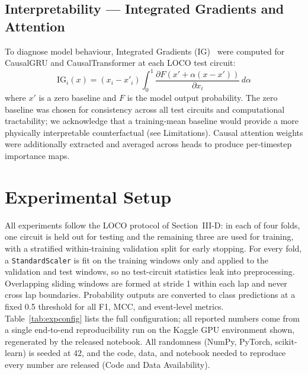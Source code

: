 \documentclass[conference,a4paper]{IEEEtran}
\begin{document}
\subsection{Interpretability — Integrated Gradients and Attention}

To diagnose model behaviour, Integrated Gradients (IG)~\cite{ref_ig} were computed
for CausalGRU and CausalTransformer at each LOCO test circuit:
\begin{equation}
  \text{IG}_i(x) = (x_i - x'_i) \int_0^1
    \frac{\partial F(x' + \alpha(x - x'))}{\partial x_i} \, d\alpha
  \label{eq:ig}
\end{equation}
where $x'$ is a zero baseline and $F$ is the model output probability.
The zero baseline was chosen for consistency across all test circuits and computational
tractability; we acknowledge that a training-mean baseline would provide a more
physically interpretable counterfactual (see Limitations).
Causal attention weights were additionally extracted and averaged across heads to
produce per-timestep importance maps.


\section{Experimental Setup}

All experiments follow the LOCO protocol of Section~III-D: in each of four folds, one
circuit is held out for testing and the remaining three are used for training, with a
stratified within-training validation split for early stopping. For every fold, a
\texttt{StandardScaler} is fit on the training windows only and applied to the validation
and test windows, so no test-circuit statistics leak into preprocessing. Overlapping
sliding windows are formed at stride 1 within each lap and never cross lap boundaries.
Probability outputs are converted to class predictions at a fixed 0.5 threshold for all
F1, MCC, and event-level metrics. Table~\ref{tab:expconfig} lists the full configuration;
all reported numbers come from a single end-to-end reproducibility run on the
Kaggle GPU environment shown, regenerated by the released notebook.
All randomness (NumPy, PyTorch, scikit-learn) is seeded at 42, and the code, data, and
notebook needed to reproduce every number are released (Code and Data Availability).
\end{document}
